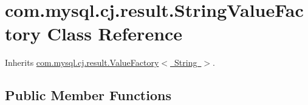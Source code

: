 \hypertarget{classcom_1_1mysql_1_1cj_1_1result_1_1_string_value_factory}{}\section{com.\+mysql.\+cj.\+result.\+String\+Value\+Factory Class Reference}
\label{classcom_1_1mysql_1_1cj_1_1result_1_1_string_value_factory}


Inherits \mbox{\hyperlink{interfacecom_1_1mysql_1_1cj_1_1result_1_1_value_factory}{com.\+mysql.\+cj.\+result.\+Value\+Factory$<$ String $>$}}.

\subsection*{Public Member Functions}
